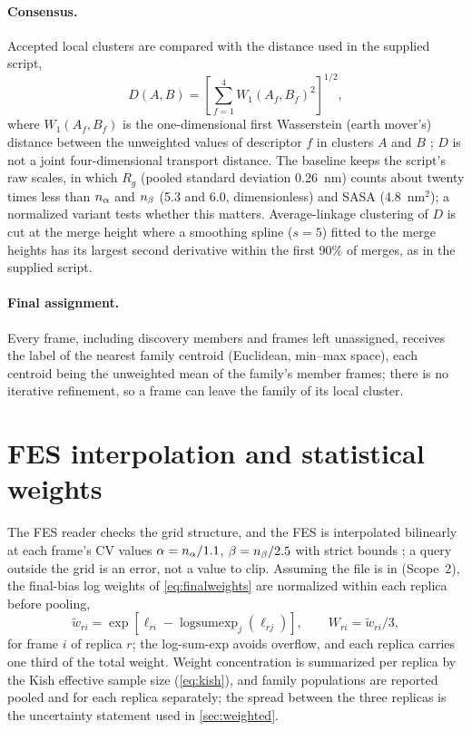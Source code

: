 \paragraph{Consensus.} Accepted local clusters are compared with the distance used in the supplied script,
\begin{equation}
D(A,B)=\left[\sum_{f=1}^{4}W_1(A_f,B_f)^2\right]^{1/2},
\label{eq:wasserstein}
\end{equation}
where $W_1(A_f,B_f)$ is the one-dimensional first Wasserstein (earth mover's) distance between the unweighted values of descriptor $f$ in clusters $A$ and $B$ \autocite{scipywasserstein}; $D$ is not a joint four-dimensional transport distance. The baseline keeps the script's raw scales, in which $R_g$ (pooled standard deviation 0.26~nm) counts about twenty times less than $n_{\alpha}$ and $n_{\beta}$ (5.3 and 6.0, dimensionless) and SASA (4.8~nm$^2$); a normalized variant tests whether this matters. Average-linkage clustering of $D$ is cut at the merge height where a smoothing spline ($s=5$) fitted to the merge heights has its largest second derivative within the first 90\% of merges, as in the supplied script.

\paragraph{Final assignment.} Every frame, including discovery members and frames left unassigned, receives the label of the nearest family centroid (Euclidean, min--max space), each centroid being the unweighted mean of the family's member frames; there is no iterative refinement, so a frame can leave the family of its local cluster.

\section{FES interpolation and statistical weights}
\label{sec:fesweights}
The FES reader checks the grid structure, and the FES is interpolated bilinearly at each frame's CV values $\alpha=n_{\alpha}/1.1$, $\beta=n_{\beta}/2.5$ with strict bounds \autocite{scipygrid,virtanen2020}; a query outside the grid is an error, not a value to clip. Assuming the file is in \kJmol{} (Scope~2), the final-bias log weights of \cref{eq:finalweights} are normalized within each replica before pooling,
\begin{equation}
\widetilde w_{ri}=\exp\!\left[\ell_{ri}-\operatorname{logsumexp}_j(\ell_{rj})\right],
\qquad W_{ri}=\widetilde w_{ri}/3,
\label{eq:replicaweights}
\end{equation}
for frame $i$ of replica $r$; the log-sum-exp avoids overflow, and each replica carries one third of the total weight. Weight concentration is summarized per replica by the Kish effective sample size (\cref{eq:kish}), and family populations are reported pooled and for each replica separately; the spread between the three replicas is the uncertainty statement used in \cref{sec:weighted}.

